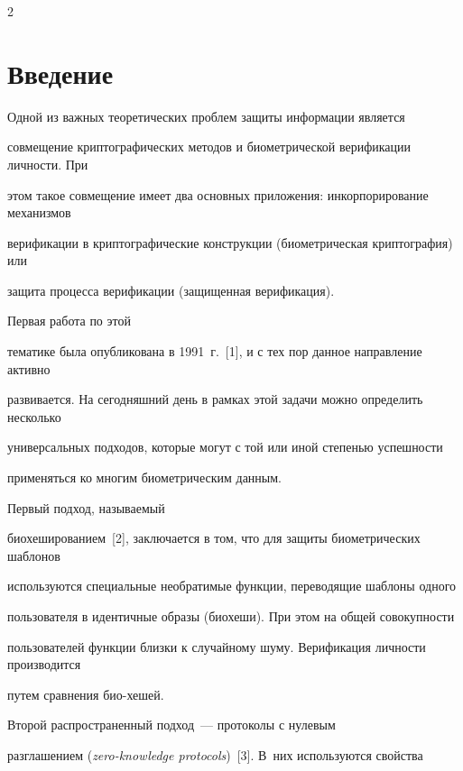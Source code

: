       \begin{multicols}{2}

      

            \label{st\stat}



\section{Введение}



      Одной из важных теоретических проблем защи\-ты информации является 

совмещение криптографических методов и биометрической верификации личности. При 

этом такое совмещение \mbox{имеет} два основных приложения: инкорпорирование механизмов 

верификации\- в криптографические конструк\-ции (биометрическая криптография) или 

защита процесса верификации (защищенная верификация). 



Первая работа по этой 

тематике была опубликована в 1991~г.~[1], и с тех пор данное направление активно 

развивается. На сегодняшний день в рамках этой задачи можно определить несколько 

универсальных подходов, которые могут с той или иной степенью успешности 

применяться ко многим биометрическим данным. 



Первый подход, называемый 

биохешированием~[2], заключается в том, что для защиты биометрических шаб\-ло\-нов 

используются специальные необратимые функции, переводящие шаблоны одного 

пользователя в идентичные образы (биохеши). При этом на общей совокупности 

пользователей функции близки к случайному шуму. Верификация личности производится 

путем сравнения био-\linebreak хешей. 



Второй распространенный подход~--- протоколы с нулевым 

разглашением (\textit{zero-knowledge protocols})~[3]. В~них используются свойства 


\end{multicols}
